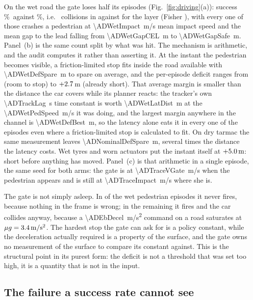 \documentclass[conference]{IEEEtran}
\theoremstyle{definition}
\begin{document}
On the wet road the gate loses half its episodes
(Fig.~\ref{fig:driving}(a)): success \ADWetSuccSafe\%\ against
\ADWetSuccCEL\%, i.e.\ \ADWetCollSafe{} collisions in \ADWetN{} against
\ADWetCollCEL{} for the layer (Fisher \ADWetCollP), with every one of those
crashes a pedestrian at \SI{\ADWetImpact}{m/s} mean impact speed and the mean gap
to the lead falling from \SI{\ADWetGapCEL}{m} to \SI{\ADWetGapSafe}{m}. Panel~(b)
is the same count split by what was hit. The mechanism is
arithmetic, and the audit computes it rather than asserting it. At the instant
the pedestrian becomes visible, a friction-limited stop fits inside the road
available with \SI{\ADWetDefSpare}{m} to spare on average, and the per-episode
deficit ranges from \ADWetDefMin{} (room to stop) to $+2.7$\,m
(already short). That average margin is smaller than the distance the car covers
while its planner reacts: the tracker's own \SI{\ADTrackLag}{s} time constant
is worth \SI{\ADWetLatDist}{m} at the \SI{\ADWetPedSpeed}{m/s} it was doing,
and the largest margin anywhere in the channel is \SI{\ADWetDefBest}{m}, so
the latency alone eats it in every one of the \ADWetCollSafe{} episodes even
where a friction-limited stop is calculated to fit. On dry tarmac
the same measurement leaves \SI{\ADNominalDefSpare}{m}, several times the
distance the latency costs. Wet tyres and worn actuators put the instant itself
at $+\SI{5.0}{m}$: short before anything has moved.
Panel~(c) is that arithmetic in a single episode, the same seed for both arms:
the gate is at \SI{\ADTraceVGate}{m/s} when the pedestrian appears and is still
at \SI{\ADTraceImpact}{m/s} where she is.

The gate is not simply asleep. In \ADWetPedNoEB{} of the \ADWetPedN{} wet
pedestrian episodes it never fires, because nothing in the frame is wrong; in
the remaining \ADWetPedEB{} it fires and the car collides anyway, because a
\SI{\ADEbDecel}{m/s^2} command on a \ADMuWet{} road saturates at
$\mu g=\SI{3.4}{m/s^2}$. The hardest stop the gate can ask for is a policy
constant, while the deceleration actually required is a property of the surface,
and the gate owns no measurement of the surface to compare its constant against.
This is the structural point in its purest form: the deficit is not a threshold
that was set too high, it is a quantity that is not in the input.

\subsection{The failure a success rate cannot see}
\end{document}
